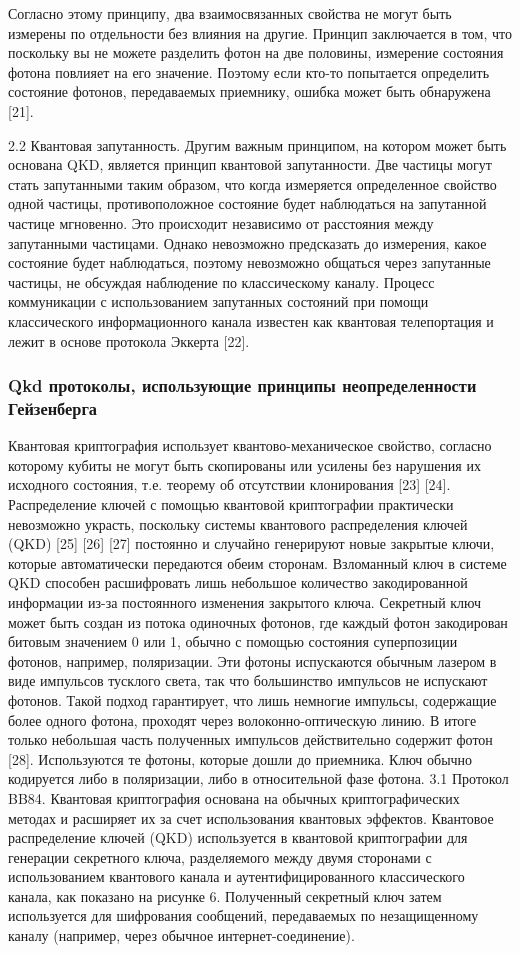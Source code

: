 Согласно этому принципу, два взаимосвязанных свойства не могут быть измерены по отдельности без влияния на другие. Принцип заключается в том, что поскольку вы не можете разделить фотон на две половины, измерение состояния фотона повлияет на его значение. Поэтому если кто-то попытается определить состояние фотонов, передаваемых приемнику, ошибка может быть обнаружена [21].

2.2 Квантовая запутанность. Другим важным принципом, на котором может быть основана QKD, является принцип квантовой запутанности. Две частицы могут стать запутанными таким образом, что когда измеряется определенное свойство одной частицы, противоположное состояние будет наблюдаться на запутанной частице мгновенно. Это происходит независимо от расстояния между запутанными частицами. Однако невозможно предсказать до измерения, какое состояние будет наблюдаться, поэтому невозможно общаться через запутанные частицы, не обсуждая наблюдение по классическому каналу. Процесс коммуникации с использованием запутанных состояний при помощи классического информационного канала известен как квантовая телепортация и лежит в основе протокола Эккерта [22].

\subsubsection{Qkd протоколы, использующие принципы неопределенности Гейзенберга}
Квантовая криптография использует квантово-механическое свойство, согласно которому кубиты не могут быть скопированы или усилены без нарушения их исходного состояния, т.е. теорему об отсутствии клонирования [23] [24]. Распределение ключей с помощью квантовой криптографии практически невозможно украсть, поскольку системы квантового распределения ключей (QKD) [25] [26] [27] постоянно и случайно генерируют новые закрытые ключи, которые автоматически передаются обеим сторонам. Взломанный ключ в системе QKD способен расшифровать лишь небольшое количество закодированной информации из-за постоянного изменения закрытого ключа. Секретный ключ может быть создан из потока одиночных фотонов, где каждый фотон закодирован битовым значением 0 или 1, обычно с помощью состояния суперпозиции фотонов, например, поляризации. Эти фотоны испускаются обычным лазером в виде импульсов тусклого света, так что большинство импульсов не испускают фотонов. Такой подход гарантирует, что лишь немногие импульсы, содержащие более одного фотона, проходят через волоконно-оптическую линию. В итоге только небольшая часть полученных импульсов действительно содержит фотон [28]. Используются те фотоны, которые дошли до приемника. Ключ обычно кодируется либо в поляризации, либо в относительной фазе фотона.
3.1 Протокол BB84. Квантовая криптография основана на обычных криптографических методах и расширяет их за счет использования квантовых эффектов. Квантовое распределение ключей (QKD) используется в квантовой криптографии для генерации секретного ключа, разделяемого между двумя сторонами с использованием квантового канала и аутентифицированного классического канала, как показано на рисунке 6. Полученный секретный ключ затем используется для шифрования сообщений, передаваемых по незащищенному каналу (например, через обычное интернет-соединение).


